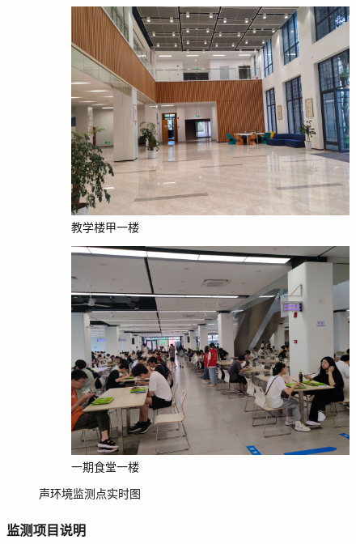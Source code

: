 \begin{figure}[H]
\begin{subfigure}[htb]{0.48\textwidth}
        \centering
        \includegraphics[width=\textwidth]{figures/Monitoring_point_-_the_first_floor_of_the_teaching_building.jpg}
        \caption{教学楼甲一楼}
    \end{subfigure}
    \hfill
    \begin{subfigure}[htb]{0.48\textwidth}
        \centering
        \includegraphics[width=\textwidth]{figures/Monitoring_point_-_the_first_floor_of_the_canteen_of_the_first_phase.jpg}
        \caption{一期食堂一楼}
    \end{subfigure}
    \caption{声环境监测点实时图}
    \label{fig:Sound_environment_monitoring_points}
\end{figure}


\subsubsection{监测项目说明}

